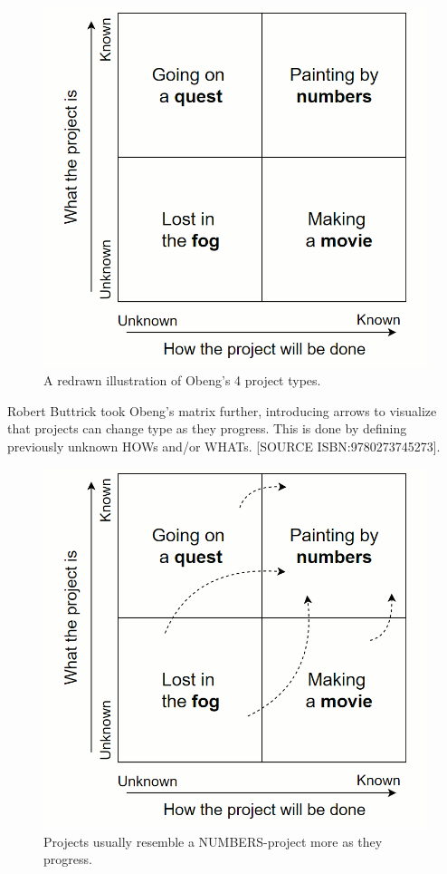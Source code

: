 \begin{figure}[H]
\hspace*{-1cm}
\centering
\includegraphics[scale=0.2]{figure/obeng1.png}
\caption{A redrawn illustration of Obeng's 4 project types.}
\label{obeng1}
\end{figure}

Robert Buttrick took Obeng's matrix further, introducing arrows to visualize that projects can change type as they progress. This is done by defining previously unknown HOWs and/or WHATs. [SOURCE ISBN:9780273745273].

\begin{figure}[H]
\hspace*{-1cm}
\centering
\includegraphics[scale=0.2]{figure/obeng2.png}
\caption{Projects usually resemble a NUMBERS-project more as they progress.}
\label{obeng2}
\end{figure}

